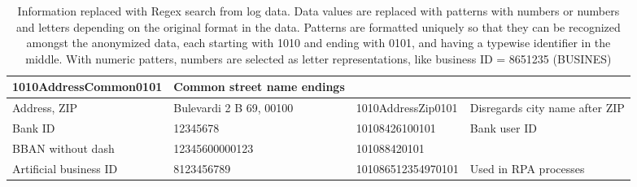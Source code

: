 \begin{table}[]
\begin{tabularx}{\textwidth}{|L{0.17\textwidth}|L{0.27\textwidth}|L{0.30\textwidth}|Y|}
        1010AddressCommon0101 &
        Common street name endings
        \\ \hline
        Address, ZIP &
        Bulevardi 2 B 69, 00100 &
        1010AddressZip0101 &
        Disregards city name after ZIP
        \\ \hline
        Bank ID &
        12345678 &
        10108426100101 &
        Bank user ID
        \\ \hline
        BBAN without dash &
        12345600000123 &
        101088420101 &
        \\ \hline
        Artificial business ID &
        8123456789 &
        101086512354970101 &
        Used in RPA processes
        \\ \hline
    \end{tabularx}
    \caption{Information replaced with Regex search from log data.
    Data values are replaced with patterns with numbers or numbers and letters
    depending on the original format in the data.
    Patterns are formatted uniquely so that they can be recognized amongst the anonymized data,
    each starting with 1010 and ending with 0101,
    and having a typewise identifier in the middle.
    With numeric patters,
    numbers are selected as letter representations,
    like business ID = 8651235 (BUSINES)}
    \label{tab:regex-sensitive-info}
\end{table}



